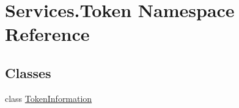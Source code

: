 \hypertarget{namespace_services_1_1_token}{}\section{Services.\+Token Namespace Reference}
\label{namespace_services_1_1_token}
\subsection*{Classes}
\begin{DoxyCompactItemize}
\item 
class \hyperlink{class_services_1_1_token_1_1_token_information}{Token\+Information}
\end{DoxyCompactItemize}
